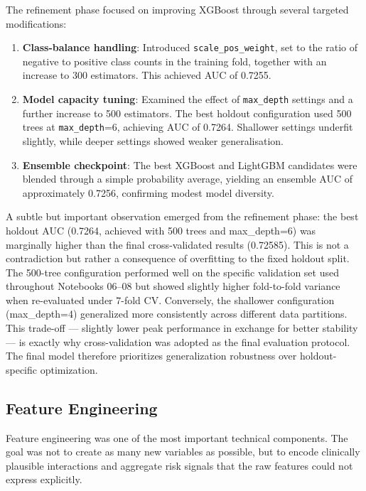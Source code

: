 \documentclass[a4paper,11pt]{article}
\begin{document}
The refinement phase focused on improving XGBoost through several targeted modifications:

\begin{enumerate}
    \item \textbf{Class-balance handling}: Introduced \texttt{scale\_pos\_weight}, set to the ratio of negative to positive class counts in the training fold, together with an increase to 300 estimators. This achieved AUC of 0.7255.
    
    \item \textbf{Model capacity tuning}: Examined the effect of \texttt{max\_depth} settings and a further increase to 500 estimators. The best holdout configuration used 500 trees at \texttt{max\_depth}=6, achieving AUC of 0.7264. Shallower settings underfit slightly, while deeper settings showed weaker generalisation.
    
    \item \textbf{Ensemble checkpoint}: The best XGBoost and LightGBM candidates were blended through a simple probability average, yielding an ensemble AUC of approximately 0.7256, confirming modest model diversity.
\end{enumerate}

A subtle but important observation emerged from the refinement phase: the best holdout AUC (0.7264, achieved with 500 trees and max\_depth=6) was marginally higher than the final cross-validated results (0.72585). This is not a contradiction but rather a consequence of overfitting to the fixed holdout split. The 500-tree configuration performed well on the specific validation set used throughout Notebooks 06--08 but showed slightly higher fold-to-fold variance when re-evaluated under 7-fold CV. Conversely, the shallower configuration (max\_depth=4) generalized more consistently across different data partitions. This trade-off — slightly lower peak performance in exchange for better stability — is exactly why cross-validation was adopted as the final evaluation protocol. The final model therefore prioritizes generalization robustness over holdout-specific optimization.

\subsection{Feature Engineering}

Feature engineering was one of the most important technical components. The goal was not to create as many new variables as possible, but to encode clinically plausible interactions and aggregate risk signals that the raw features could not express explicitly.
\end{document}
